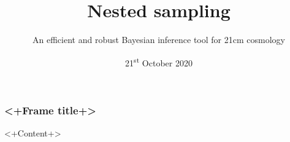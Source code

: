 \documentclass[aspectratio=169]{beamer}
\title{Nested sampling}
\subtitle{An efficient and robust Bayesian inference tool for 21cm cosmology}
\date{21\textsuperscript{st} October 2020}
\begin{document}
\begin{frame}
    \titlepage
\end{frame}

\begin{frame}
    \frametitle{<+Frame title+>}
    <+Content+>
\end{frame}
\end{document}
